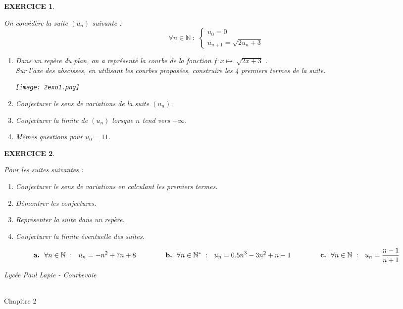 \documentclass[a4paper]{article}   %
\renewcommand{\(}{\left(}
\renewcommand{\)}{\right)}
\newtheorem{EXO}{\large EXERCICE }
\newenvironment{EX}   { \setcounter{ques}{0} \begin{EXO} \hrulefill ~\vspace{0.3cm}

\normalfont}    {\end{EXO} \medskip}
\newcommand{\f}{\dfrac} 	%
\newcommand{\ass}{\mapsto~}		%
\def\cl{{\large \bf{1èreG1}}}
\begin{document}
\begin{EX}
On considère la suite $(u_n)$ suivante : 
$$\forall n \in \mathbb{N}~:~~\left \{ \begin{array}{l}
u_0=0	 \\           			
u_{n+1}=\sqrt{2u_n+3}		 
\end{array} \right.$$
\begin{enumerate}
\item Dans un repère du plan, on a représenté la courbe de la fonction $f : x \ass \sqrt{2x+3}$ . \\
Sur l'axe des abscisses, en utilisant les courbes proposées, construire les 4 premiers termes de la suite.
\begin{center}
\texttt{[image: 2exo1.png]}
\end{center}
\item Conjecturer le sens de variations de la suite $(u_n)$. 
\item Conjecturer la limite de $(u_n)$ lorsque $n$ tend vers $+\infty$.

\item Mêmes questions pour $u_0=11$.
\end{enumerate}

\end{EX}

\begin{EX} 
Pour les suites suivantes : 
\begin{enumerate}
\item Conjecturer le sens de variations en calculant les premiers termes.
\item Démontrer les conjectures.
\item Représenter la suite dans un repère.
\item Conjecturer la limite éventuelle des suites.
\end{enumerate}
$$ \textbf{a.} ~~\forall n \in \mathbb{N}~:~~ u_{n}=-n^2+7n+8  \hspace{1.5cm}  
\textbf{b.} ~~\forall n \in \mathbb{N}^*~:~~u_{n}=0.5n^3-3n^2+n-1  \hspace{1.5cm}  
\textbf{c.} ~~\forall n \in \mathbb{N}~:~~u_n=\f{n-1}{n+1}  $$  


\end{EX}


\newpage \setcounter{EXO}{0}

\noindent\begin{minipage}{.20\linewidth}\begin{center}                  
\noindent \emph{Lycée Paul Lapie - Courbevoie}
\end{center}\end{minipage}
\begin{minipage}{1.5\linewidth}\begin{center}	
\noindent \cl\\ Chapitre 2
\end{center}\end{minipage}
\end{document}
